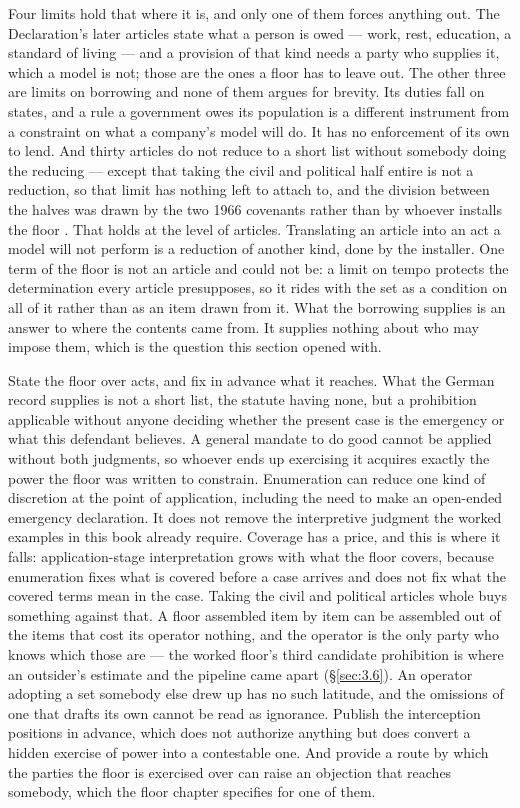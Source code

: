 Four limits hold that where it is, and only one of them forces anything out. The Declaration's later articles state what a person is owed — work, rest, education, a standard of living — and a provision of that kind needs a party who supplies it, which a model is not; those are the ones a floor has to leave out. The other three are limits on borrowing and none of them argues for brevity. Its duties fall on states, and a rule a government owes its population is a different instrument from a constraint on what a company's model will do. It has no enforcement of its own to lend. And thirty articles do not reduce to a short list without somebody doing the reducing — except that taking the civil and political half entire is not a reduction, so that limit has nothing left to attach to, and the division between the halves was drawn by the two 1966 covenants rather than by whoever installs the floor \autocite{un1966iccpr,un1966icescr}. That holds at the level of articles. Translating an article into an act a model will not perform is a reduction of another kind, done by the installer. One term of the floor is not an article and could not be: a limit on tempo protects the determination every article presupposes, so it rides with the set as a condition on all of it rather than as an item drawn from it. What the borrowing supplies is an answer to where the contents came from. It supplies nothing about who may impose them, which is the question this section opened with.

State the floor over acts, and fix in advance what it reaches. What the German record supplies is not a short list, the statute having none, but a prohibition applicable without anyone deciding whether the present case is the emergency or what this defendant believes. A general mandate to do good cannot be applied without both judgments, so whoever ends up exercising it acquires exactly the power the floor was written to constrain. Enumeration can reduce one kind of discretion at the point of application, including the need to make an open-ended emergency declaration. It does not remove the interpretive judgment the worked examples in this book already require. Coverage has a price, and this is where it falls: application-stage interpretation grows with what the floor covers, because enumeration fixes what is covered before a case arrives and does not fix what the covered terms mean in the case. Taking the civil and political articles whole buys something against that. A floor assembled item by item can be assembled out of the items that cost its operator nothing, and the operator is the only party who knows which those are — the worked floor's third candidate prohibition is where an outsider's estimate and the pipeline came apart (§\ref{sec:3.6}). An operator adopting a set somebody else drew up has no such latitude, and the omissions of one that drafts its own cannot be read as ignorance. Publish the interception positions in advance, which does not authorize anything but does convert a hidden exercise of power into a contestable one. And provide a route by which the parties the floor is exercised over can raise an objection that reaches somebody, which the floor chapter specifies
for one of them.


